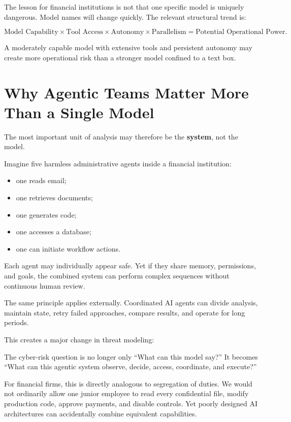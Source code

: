 The lesson for financial institutions is not that one specific model is uniquely dangerous. Model names will change quickly. The relevant structural trend is:

\begin{equation}
\text{Model Capability}
\times
\text{Tool Access}
\times
\text{Autonomy}
\times
\text{Parallelism}
=
\text{Potential Operational Power}.
\end{equation}

A moderately capable model with extensive tools and persistent autonomy may create more operational risk than a stronger model confined to a text box.

\section{Why Agentic Teams Matter More Than a Single Model}

The most important unit of analysis may therefore be the \textbf{system}, not the model.

Imagine five harmless administrative agents inside a financial institution:

\begin{itemize}
    \item one reads email;
    \item one retrieves documents;
    \item one generates code;
    \item one accesses a database;
    \item one can initiate workflow actions.
\end{itemize}

Each agent may individually appear safe. Yet if they share memory, permissions, and goals, the combined system can perform complex sequences without continuous human review.

The same principle applies externally. Coordinated AI agents can divide analysis, maintain state, retry failed approaches, compare results, and operate for long periods.

This creates a major change in threat modeling:

\begin{intuition}
The cyber-risk question is no longer only ``What can this model say?'' It becomes ``What can this agentic system observe, decide, access, coordinate, and execute?''
\end{intuition}

For financial firms, this is directly analogous to segregation of duties. We would not ordinarily allow one junior employee to read every confidential file, modify production code, approve payments, and disable controls. Yet poorly designed AI architectures can accidentally combine equivalent capabilities.

